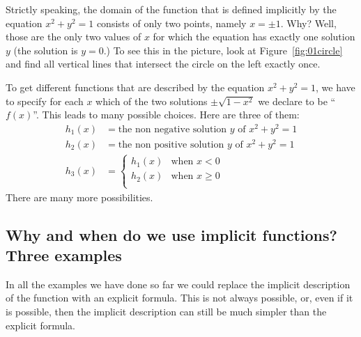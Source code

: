 Strictly speaking, the domain of the function that is defined implicitly by
the equation $x^2+y^2=1$ consists of only two points, namely $x=\pm1$.
Why?  Well, those are the only two values of $x$ for which the equation has
exactly one solution $y$ (the solution is $y=0$.)  To see this in the
picture, look at Figure~\ref{fig:01circle} and find all vertical lines that
intersect the circle on the left exactly once.  


To get different functions that are described by the equation $x^2+y^2=1$,
we have to specify for each $x$ which of the two solutions
$\pm\sqrt{1-x^2}$ we declare to be ``$f(x)$''.  This leads to many possible
choices.  Here are three of them:
\begin{align*}
  h_1(x) & = \text{the non negative solution $y$ of } x^2+y^2=1 \\
  h_2(x) & = \text{the non positive solution $y$ of } x^2+y^2=1 \\
  h_3(x) & =
  \begin{cases}
    h_1(x) & \text{when $x<0$} \\
    h_2(x) & \text{when $x\geq0$} \\
  \end{cases}
\end{align*}
There are many more possibilities.



\subsection{Why and when do we use implicit functions? Three examples} 
\label{sec:why-implicit}
In all the examples we have done so far we could replace the implicit
description of the function with an explicit formula.  This is not always
possible, or, even if it is possible, then the implicit description can still be much
simpler than the explicit formula.



